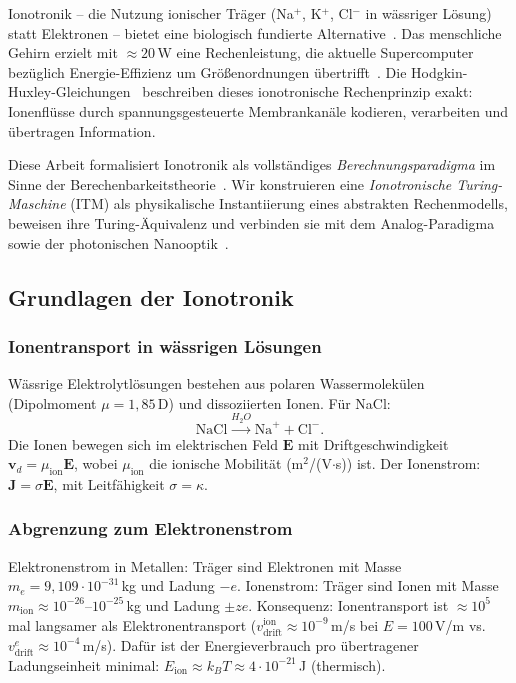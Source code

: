 ﻿\documentclass[a4paper,12pt]{article}
\theoremstyle{plain}
\theoremstyle{definition}
\theoremstyle{remark}
\begin{document}
Ionotronik -- die Nutzung ionischer Tr\"ager (Na$^+$, K$^+$, Cl$^-$
in w\"assriger L\"osung) statt Elektronen -- bietet eine biologisch
fundierte Alternative~\cite{yang2018,robin2021,bocquet2020}.
Das menschliche Gehirn erzielt mit $\approx 20\,$W eine Rechenleistung,
die aktuelle Supercomputer bez\"uglich Energie-Effizienz um Gr\"o{\ss}enordnungen
\"ubertrifft~\cite{markram2006}.
Die Hodgkin-Huxley-Gleichungen~\cite{hodgkin1952} beschreiben dieses
ionotronische Rechenprinzip exakt: Ionenfl\"usse durch spannungsgesteuerte
Membrankan\"ale kodieren, verarbeiten und \"ubertragen Information.

Diese Arbeit formalisiert Ionotronik als vollst\"andiges \emph{Berechnungsparadigma}
im Sinne der Berechenbarkeitstheorie~\cite{sipser2013}.
Wir konstruieren eine \emph{Ionotronische Turing-Maschine} (ITM) als physikalische
Instantiierung eines abstrakten Rechenmodells, beweisen ihre Turing-\"Aquivalenz
und verbinden sie mit dem Analog-Paradigma~\cite{epp2026analog} sowie
der photonischen Nanooptik~\cite{epp2026oqtum}.

\subsection{Grundlagen der Ionotronik}

\subsubsection{Ionentransport in w\"assrigen L\"osungen}

W\"assrige Elektrolytl\"osungen bestehen aus polaren Wassermolek\"ulen
(Dipolmoment $\mu = 1{,}85\,$D) und dissoziierten Ionen.
F\"ur NaCl:
\[
\mathrm{NaCl} \xrightarrow{H_2O} \mathrm{Na}^+ + \mathrm{Cl}^-.
\]
Die Ionen bewegen sich im elektrischen Feld $\mathbf{E}$ mit Driftgeschwindigkeit
$\mathbf{v}_d = \mu_{\mathrm{ion}} \mathbf{E}$, wobei $\mu_{\mathrm{ion}}$
die ionische Mobilit\"at (m$^2$/(V$\cdot$s)) ist.
Der Ionenstrom: $\mathbf{J} = \sigma \mathbf{E}$, mit Leitf\"ahigkeit $\sigma = \kappa$.

\subsubsection{Abgrenzung zum Elektronenstrom}

Elektronenstrom in Metallen: Tr\"ager sind Elektronen mit Masse
$m_e = 9{,}109 \cdot 10^{-31}\,$kg und Ladung $-e$.
Ionenstrom: Tr\"ager sind Ionen mit Masse $m_{\mathrm{ion}} \approx 10^{-26}$--$10^{-25}\,$kg
und Ladung $\pm ze$.
Konsequenz: Ionentransport ist $\approx 10^5$ mal langsamer als Elektronentransport
($v_{\mathrm{drift}}^{\mathrm{ion}} \approx 10^{-9}$\,m/s bei $E = 100\,$V/m
vs.\ $v_{\mathrm{drift}}^e \approx 10^{-4}$\,m/s).
Daf\"ur ist der Energieverbrauch pro \"ubertragener Ladungseinheit minimal:
$E_{\mathrm{ion}} \approx k_B T \approx 4 \cdot 10^{-21}\,$J (thermisch).
\end{document}
